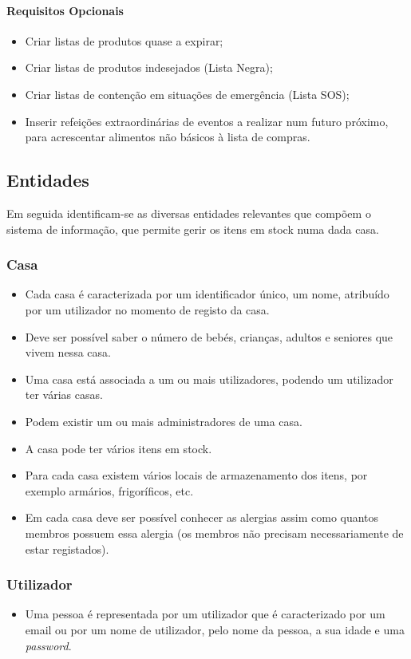 \paragraph{Requisitos Opcionais}
\begin{itemize}
	\item Criar listas de produtos quase a expirar;
	\item Criar listas de produtos indesejados (Lista Negra);
	\item Criar listas de contenção em situações de emergência (Lista SOS);
	\item Inserir refeições extraordinárias de eventos a realizar num futuro próximo, para acrescentar alimentos não básicos à lista de compras.
\end{itemize}

%
%
\subsection{Entidades} \label{subsec212}

Em seguida identificam-se as diversas entidades relevantes que compõem o sistema de informação, que permite gerir os itens em stock numa dada casa.
\subsubsection{Casa}
\begin{itemize}
	\item Cada casa é caracterizada por um identificador único, um nome, atribuído por um utilizador no momento de registo da casa. 
	\item Deve ser possível saber o número de bebés, crianças, adultos e seniores que vivem nessa casa.
	\item Uma casa está associada a um ou mais utilizadores, podendo um utilizador ter várias casas. 
	\item Podem existir um ou mais administradores de uma casa.
	\item A casa pode ter vários itens em stock.
	\item Para cada casa existem vários locais de armazenamento dos itens, por exemplo armários, frigoríficos, etc.
	\item Em cada casa deve ser possível conhecer as alergias assim como quantos membros possuem essa alergia (os membros não precisam necessariamente de estar registados).
\end{itemize}

\subsubsection{Utilizador}
\begin{itemize}
	\item Uma pessoa é representada por um utilizador que é caracterizado por um email ou por um nome de utilizador, pelo nome da pessoa, a sua idade e uma \textit{password}.
\end{itemize}

